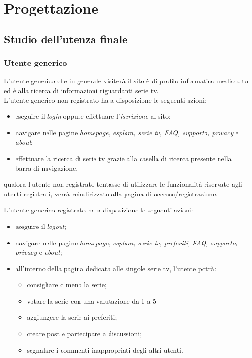 \newpage
\section{Progettazione}
\subsection{Studio dell'utenza finale}
\subsubsection{Utente generico}
L'utente generico che in generale visiterà il sito è di profilo informatico medio alto ed è alla ricerca di informazioni riguardanti serie tv.\\ 

L'utente generico non registrato ha a disposizione le seguenti azioni:
\begin{itemize}
	\item eseguire il \textit{login} oppure effettuare l'\textit{iscrizione} al sito;
	\item navigare nelle pagine \textit{homepage, esplora, serie tv, FAQ, supporto, privacy} e \textit{about};
	\item effettuare la ricerca di serie tv grazie alla casella di ricerca presente nella barra di navigazione.
\end{itemize}
qualora l'utente non registrato tentasse di utilizzare le funzionalità riservate agli utenti registrati, verrà reindirizzato alla pagina di accesso/registrazione.

L'utente generico registrato ha a disposizione le seguenti azioni:
\begin{itemize}
	\item eseguire il \textit{logout};\\
	\item navigare nelle pagine \textit{homepage, esplora, serie tv, preferiti, FAQ, supporto, privacy} e \textit{about};
	\item all'interno della pagina dedicata alle singole serie tv, l'utente potrà:
	\begin{itemize}
		\item consigliare o meno la serie;
		\item votare la serie con una valutazione da 1 a 5;
		\item aggiungere la serie ai preferiti; 
		\item creare post e partecipare a discussioni;
		\item segnalare i commenti inappropriati degli altri utenti.
	\end{itemize}
\end{itemize}


